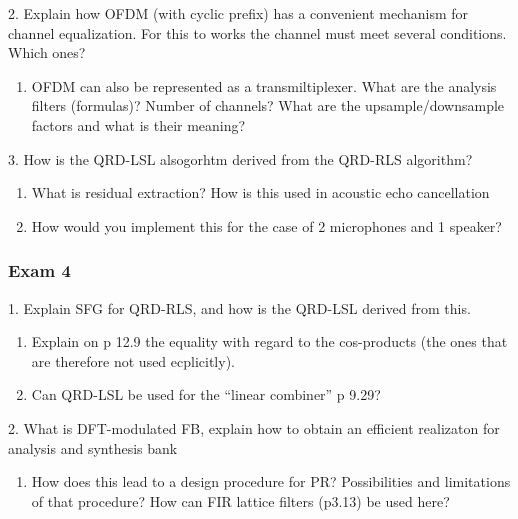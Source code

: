 \documentclass[
  a4paper,
  ,captions=tableheading
]{scrartcl}
\providecommand{\tightlist}{%
  \setlength{\itemsep}{0pt}\setlength{\parskip}{0pt}}
\begin{document}
2. Explain how OFDM (with cyclic prefix) has a convenient mechanism for
channel equalization. For this to works the channel must meet several
conditions. Which ones?

\begin{enumerate}
\def\labelenumi{\arabic{enumi}.}
\tightlist
\item
  OFDM can also be represented as a transmiltiplexer. What are the
  analysis filters (formulas)? Number of channels? What are the
  upsample/downsample factors and what is their meaning?
\end{enumerate}

3. How is the QRD-LSL alsogorhtm derived from the QRD-RLS algorithm?

\begin{enumerate}
\def\labelenumi{\arabic{enumi}.}
\tightlist
\item
  What is residual extraction? How is this used in acoustic echo
  cancellation\\
\item
  How would you implement this for the case of 2 microphones and 1
  speaker?
\end{enumerate}

\subsubsection{Exam 4}\label{exam-4}

1. Explain SFG for QRD-RLS, and how is the QRD-LSL derived from this.

\begin{enumerate}
\def\labelenumi{\arabic{enumi}.}
\tightlist
\item
  Explain on p 12.9 the equality with regard to the cos-products (the
  ones that are therefore not used ecplicitly).\\
\item
  Can QRD-LSL be used for the ``linear combiner'' p 9.29?
\end{enumerate}

2. What is DFT-modulated FB, explain how to obtain an efficient
realizaton for analysis and synthesis bank

\begin{enumerate}
\def\labelenumi{\arabic{enumi}.}
\tightlist
\item
  How does this lead to a design procedure for PR? Possibilities and
  limitations of that procedure? How can FIR lattice filters (p3.13) be
  used here?
\end{enumerate}
\end{document}
